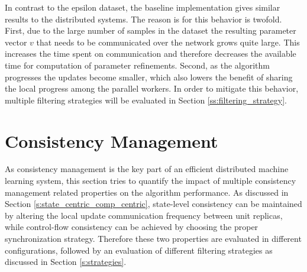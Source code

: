 In contrast to the epsilon dataset, the baseline implementation gives similar results to the distributed systems.
The reason is for this behavior is twofold.
First, due to the large number of samples in the dataset the resulting parameter vector $v$ that needs to be communicated over the network grows quite large.
This increases the time spent on communication and therefore decreases the available time for computation of parameter refinements.
Second, as the algorithm progresses the updates become smaller, which also lowers the benefit of sharing the local progress among the parallel workers.
In order to mitigate this behavior, multiple filtering strategies will be evaluated in Section \ref{ss:filtering_strategy}.

\section{Consistency Management}
As consistency management is the key part of an efficient distributed machine learning system, this section tries to quantify the impact of multiple consistency management related properties on the algorithm performance.
As discussed in Section \ref{s:state_centric_comp_centric}, state-level consistency can be maintained by altering the local update communication frequency between unit replicas, while control-flow consistency can be achieved by choosing the proper synchronization strategy.
Therefore these two properties are evaluated in different configurations, followed by an evaluation of different filtering strategies as discussed in Section \ref{s:strategies}.

